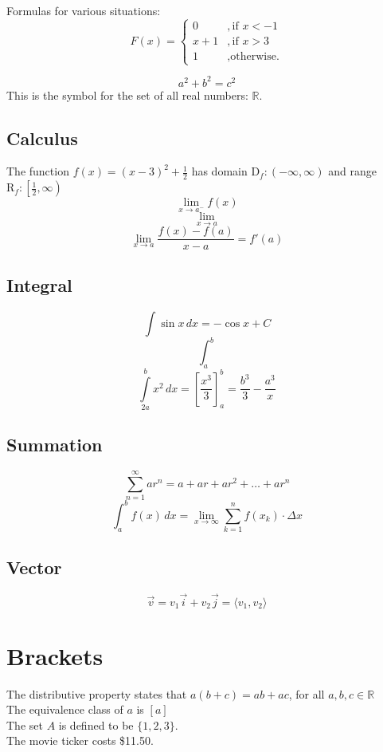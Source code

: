 \documentclass[12pt, a4paper]{article}
\begin{document}
Formulas for various situations:
\begin{equation}
    F(x)=
    \begin{cases}
        0&,\text{if $x<-1$}\\
        x+1&,\text{if $x>3$}\\
        1&,\text{otherwise.}
    \end{cases}
\end{equation}

\[
    a^2+b^2=c^2
\]
This is the symbol for the set of all real numbers: $\mathbb{R}$.

\subsection{Calculus}

The function $f(x)=(x-3)^2+\frac{1}{2}$ has domain $\mathrm{D}_f:(-\infty,\infty)$
 and range $\mathrm{R}_f:\left[ \frac{1}{2},\infty \right)$\\
 $$\lim \limits_{x \to a^-} f(x)$$
 $$\lim _{x \to a} $$
 $$\lim \limits_{x \to a}\frac{f(x)-f(a)}{x-a}=f'(a)$$

 \subsection{Integral}
 $$\int \sin x \,dx=-\cos x + C$$
 $$\int_a^b$$
 $$\int \limits_{2a}^bx^2 \,dx=\left[ \frac{x^3}{3} \right]_a^b
 =\frac{b^3}{3}-\frac{a^3}{x}$$ 

 \subsection{Summation}
$$\sum \limits_{n=1}^{\infty}ar^n=a+ar+ar^2+\dots+ar^n$$
$$\int_a^b f(x) \,dx=\lim \limits_{x \to \infty} \sum \limits_{k=1}^{n}
f(x_k) \cdot \Delta x $$

\subsection{Vector}
$$\vec{v}=v_1 \vec{i}+v_2 \vec{j} = \langle v_1, v_2 \rangle$$
\section{Brackets}

The distributive property states that $a(b+c)
=ab+ac$, for all $a,b,c\in \mathbb{R}$\\[6pt]
The equivalence class of $a$ is $[a]$\\[6pt]
The set $A$ is defined to be $\{1,2,3\}$.\\[6pt]
The movie ticker costs \$11.50.\\[6pt]  
\end{document}
